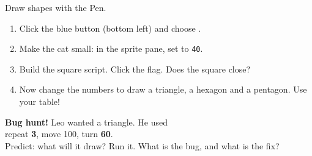 \begin{exercise}
Draw shapes with the Pen.
\begin{enumerate}[leftmargin=1.4em,itemsep=1pt]
  \item Click the blue  button (bottom left) and choose .
  \item Make the cat small: in the sprite pane, set  to \texttt{40}.
  \item Build the square script. Click the flag. Does the square close?
  \item Now change the numbers to draw a triangle, a hexagon and a pentagon. Use your table!
\end{enumerate}
\begin{center}
\begin{scratch}[scale=0.85]
\end{scratch}
\hspace{1cm}
\begin{minipage}[t]{0.42\linewidth}
\textbf{Bug hunt!} Leo wanted a triangle. He used\\
repeat \textbf{3}, move 100, turn \textbf{60}.\\[4pt]
Predict: what will it draw?
Run it. What is the bug, and what is the fix?
\end{minipage}
\end{center}
\end{exercise}


